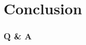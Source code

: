 \documentclass[aspectratio=169]{beamer}
\title{\deliv{\pp}{Presentation}}
\date{\datepp}
\begin{document}

\begin{frame}
\maketitle
\begin{center}
\names
\end{center}
\end{frame}

\begin{frame}
\tableofcontents
\end{frame}







\section{Conclusion}

\begin{frame}
\frametitle{Q \& A}
\github
\end{frame}

\end{document}
